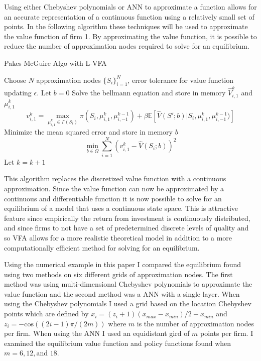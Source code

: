\documentclass[12pt]{article}
\newcommand{\norm}[1]{\left\lVert#1\right\rVert}
\begin{document}
Using either Chebyshev polynomials or ANN to approximate a function allows for an accurate representation of a continuous function using a relatively small set of points. In the following algorithm these techniques will be used to approximate the value function of firm 1. By approximating the value function, it is possible to reduce the number of approximation nodes required to solve for an equilibrium.

\begin{algorithm}[H]
  \caption{Pakes McGuire Algo with L-VFA}
  \begin{algorithmic}[1]
    \Procedure{}{} Choose $N$ approximation nodes $\{S_i\}_{i=1}^N$, error tolerance for value function updating $\epsilon$.
    \State Let $b=0$
    \While{$\norm{\hat{V}^{k}_1-\hat{V}^{k-1}_1} > \frac{\epsilon (1-\beta)}{2\beta}$}
    \State Solve the bellmann equation and store in memory $\hat{V}^k_{i,1}$ and $\mu^k_{i,1}$
    \begin{equation*}
      v^k_{i,1}=\max_{\mu^k_{i,1} \in \Gamma(S_i)} \pi(S_i, \mu^k_{i,1}, \mu^{k-1}_{i,-1})+ \beta\mathbb{E}[\hat{V}(S';b)|S_i,\mu^k_{i,1},\mu^{k-1}_{i,-1})]
    \end{equation*}
    \State Minimize the mean squared error and store in memory $b$
    \begin{equation*}
      \min_{b \in \Omega} \sum_{i=1}^N (v^k_{i,1} - \hat{V}(S_i;b))^2
    \end{equation*}
    \State Let $k=k+1$
    \EndFor
    \EndWhile
    \EndProcedure
  \end{algorithmic}
\end{algorithm}

This algorithm replaces the discretized value function with a continuous approximation. Since the value function can now be approximated by a continuous and differentiable function it is now possible to solve for an equilibrium of a model that uses a continuous state space. This is attractive feature since empirically the return from investment is continuously distributed, and since firms to not have a set of predetermined discrete levels of quality and so VFA allows for a more realistic theoretical model in addition to a more computationally efficient method for solving for an equilibrium.

Using the numerical example in this paper I compared the equilibrium found using two methods on six different grids of approximation nodes. The first method was using multi-dimensional Chebyshev polynomials to approximate the value function and the second method was a ANN with a single layer. When using the Chebyshev polynomials I used a grid based on the location Chebyshev points which are defined by $x_i=(z_i+1)(x_{max}-x_{min})/2+x_{min}$ and $z_i=-\text{cos}((2i-1)\pi/(2m))$ where $m$ is the number of approximation nodes per firm. When using the ANN I used an equidistant gird of $m$ points per firm. I examined the equilibrium value function and policy functions found when $m=6,12,\text{and }18$.
\end{document}
